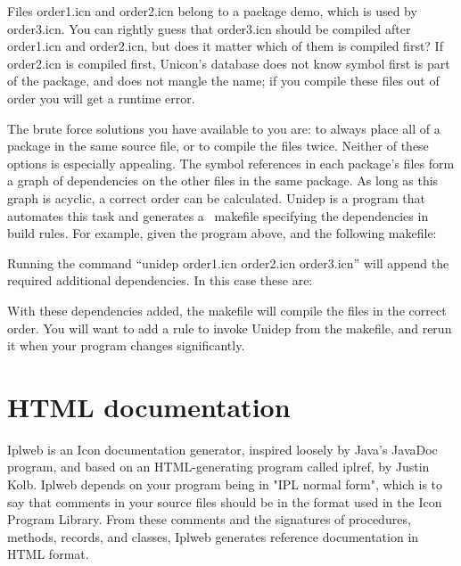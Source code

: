 Files \textsf{order1.icn} and \textsf{order2.icn} belong to a package
demo, which is used by \textsf{order3.icn}. You can rightly guess that
order3.icn should be compiled after \textsf{order1.icn} and
\textsf{order2.icn}, but does it matter which of them is compiled
first? If \textsf{order2.icn} is compiled first,
Unicon's database does not know symbol first is part
of the package, and does not mangle the name; if you compile these
files out of order you will get a runtime error.

The brute force solutions you have available to you are: to always place
all of a package in the same source file, or to compile the files
twice. Neither of these options is especially appealing. The symbol
references in each package's files form a graph of
dependencies on the other files in the same package. As long as this
graph is acyclic, a correct order can be calculated. Unidep is a
program that automates this task and generates a \ makefile specifying
the dependencies in build rules. For example, given the program above,
and the following makefile:


Running the command {\textquotedblleft}unidep order1.icn order2.icn
order3.icn{\textquotedblright} will append the required additional
dependencies. In this case these are:


With these dependencies added, the makefile will compile the files in
the correct order. You will want to add a rule to invoke Unidep from
the makefile, and rerun it when your program changes significantly.

\section{HTML documentation}

Iplweb is an Icon documentation generator, inspired
loosely by Java's JavaDoc
program, and based on an HTML{}-generating program called
iplref, by Justin Kolb. Iplweb depends on your program being in
"IPL normal form", which is to say that
comments in your source files should be in the format
used in the Icon Program Library. From these comments and the
signatures of procedures, methods, records, and classes, Iplweb
generates reference documentation in
HTML format.

